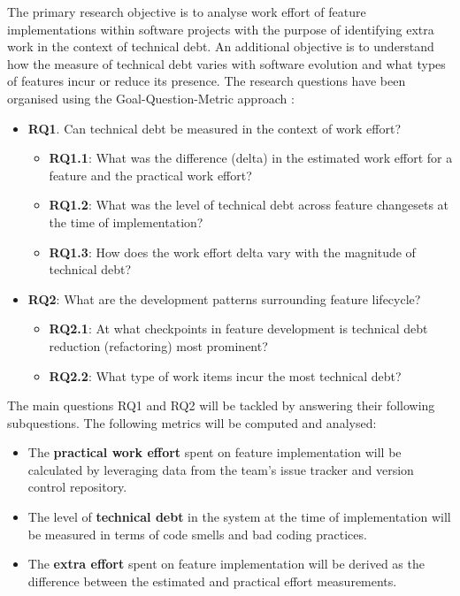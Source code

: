 \documentclass{mprop}
\begin{document}
The primary research objective is to analyse work effort of feature
implementations within software projects with the purpose of identifying extra
work in the context of technical debt. An additional objective is to understand
how the measure of technical debt varies with software evolution and what types
of features incur or reduce its presence. The research questions have been
organised using the Goal-Question-Metric approach \cite{VanSolingen2002}:
\begin{itemize}
	\item \textbf{RQ1}. Can technical debt be measured in the context of work
	      effort?
	      \begin{itemize}
		      \item \textbf{RQ1.1}: What was the difference (delta) in the
		            estimated work effort for a feature and the practical work
		            effort?
		      \item \textbf{RQ1.2}: What was the level of technical debt across
		            feature changesets at the time of implementation?
		      \item \textbf{RQ1.3}: How does the work effort delta vary with the
		            magnitude of technical debt?
	      \end{itemize}
	\item \textbf{RQ2}: What are the development patterns surrounding feature
	      lifecycle?
	      \begin{itemize}
		      \item \textbf{RQ2.1}: At what checkpoints in feature development
		            is technical debt reduction (refactoring) most prominent?
		      \item \textbf{RQ2.2}: What type of work items incur the most
		            technical debt?
	      \end{itemize}
\end{itemize}

The main questions RQ1 and RQ2 will be tackled by answering their following
subquestions. The following metrics will be computed and analysed:
\begin{itemize}
	\item The \textbf{practical work effort} spent on feature implementation
	      will be calculated by leveraging data from the team's issue tracker and
	      version control repository.
	\item The level of \textbf{technical debt} in the system at the time of
	      implementation will be measured in terms of code smells and bad coding
	      practices.
	\item The \textbf{extra effort} spent on feature implementation will be
	      derived as the difference between the estimated and practical effort
	      measurements.
\end{itemize}
\end{document}
